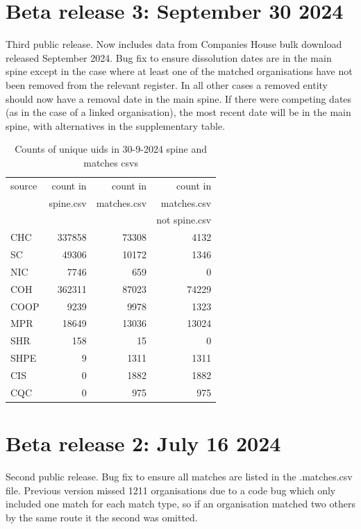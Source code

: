 \documentclass{article}
\begin{document}
\section{Beta release 3: September 30 2024}

Third public release. Now includes data from Companies House bulk download released September 2024.
Bug fix to ensure dissolution dates are in the main spine except in the case where at least one of the 
matched organisations have not been removed from the relevant register. In all other cases a removed entity should
now have a removal date in the main spine. If there were competing dates (as in the case of a linked organisation), the most recent
date will be in the main spine, with alternatives in the supplementary table.
\begin{table}[h]
    \centering
    \begin{tabularx}{0.6\textwidth}{|X|r|r|r|}
    \hline
    source & count in & count in & count in \\
    & spine.csv &  matches.csv &  matches.csv \\
    &&& not spine.csv \\
    \hline
CHC & 337858 & 73308 & 4132 \\
SC & 49306 & 10172 & 1346 \\
NIC & 7746 & 659 & 0 \\
COH & 362311 & 87023 & 74229 \\
COOP & 9239 & 9978 & 1323 \\
MPR & 18649 & 13036 & 13024 \\
SHR & 158 & 15 & 0 \\
SHPE & 9 & 1311 & 1311 \\
CIS & 0 & 1882 & 1882 \\
CQC & 0 & 975 & 975 \\
    \hline
\end{tabularx}
\caption{Counts of unique uids in 30-9-2024 spine and matches csvs}
\end{table}


\section{Beta release 2: July 16 2024}

Second public release. Bug fix to ensure all matches are listed in the .matches.csv file. Previous version
missed 1211 organisations due to a code bug which only included one match for each match type, so if
an organisation matched two others by the same route it the second was omitted.
\end{document}
